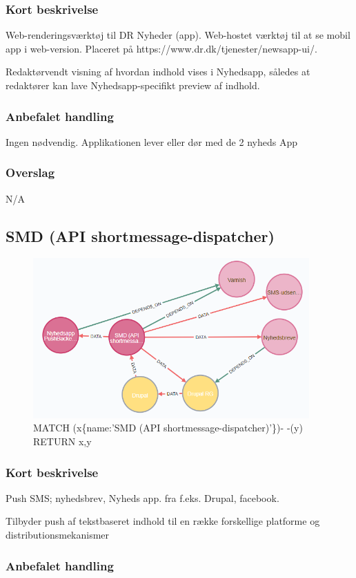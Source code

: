 \documentclass{article}
\begin{document}
\subsubsection{Kort beskrivelse}
Web-renderingsværktøj til DR Nyheder (app). Web-hostet værktøj til at se mobil app i web-version. Placeret på https://www.dr.dk/tjenester/newsapp-ui/.	

Redaktørvendt visning af hvordan indhold vises i Nyhedsapp, således at redaktører kan lave Nyhedsapp-specifikt preview af indhold.
\subsubsection{Anbefalet handling}
Ingen nødvendig. Applikationen lever eller dør med de 2 nyheds App
\subsubsection{Overslag}
N/A

\subsection{SMD (API shortmessage-dispatcher)}
\begin{figure}[h]
\includegraphics[width=300pt]{SMD.PNG}
\caption{MATCH (x\{name:'SMD (API shortmessage-dispatcher)'\})- -(y) RETURN x,y}
\end{figure}
\subsubsection{Kort beskrivelse}
Push SMS; nyhedsbrev, Nyheds app. fra f.eks. Drupal, facebook.

Tilbyder push af tekstbaseret indhold til en række forskellige platforme og distributionsmekanismer
\subsubsection{Anbefalet handling}
\end{document}

